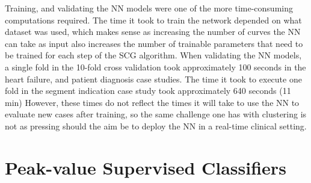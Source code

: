 Training, and validating the NN models were one of the more time-consuming computations required.
The time it took to train the network depended on what dataset was used, which makes sense as increasing the number of curves the NN can take as input also increases the number of trainable parameters that need to be trained for each step of the SCG algorithm.
When validating the NN models, a single fold in the 10-fold cross validation took approximately 100 seconds in the heart failure, and patient diagnosis case studies.
The time it took to execute one fold in the segment indication case study took approximately 640 seconds (11 min)
However, these times do not reflect the times it will take to use the NN to evaluate new cases after training, so the same challenge one has with clustering is not as pressing should the aim be to deploy the NN in a real-time clinical setting.

\section{Peak-value Supervised Classifiers} \label{sec:disc_pvsc}

